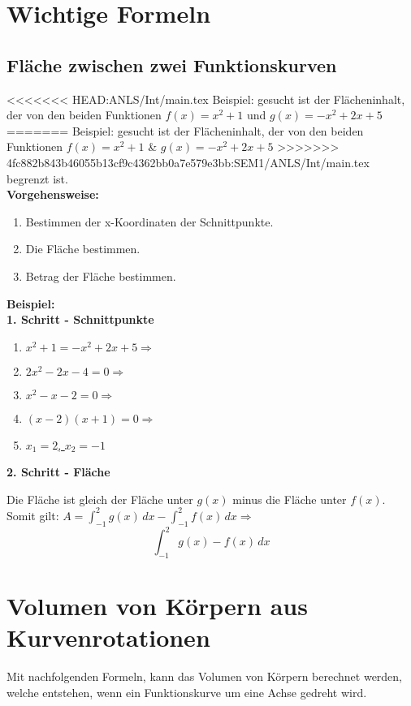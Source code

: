 \documentclass[12pt]{scrartcl}
\begin{document}
\newpage
\section{Wichtige Formeln}
\subsection{Fläche zwischen zwei Funktionskurven}
<<<<<<< HEAD:ANLS/Int/main.tex
Beispiel: gesucht ist der Flächeninhalt, der von den beiden Funktionen $f(x) = x^2 + 1$ und $g(x) = -x^2 + 2x + 5$
=======
Beispiel: gesucht ist der Flächeninhalt, der von den beiden Funktionen $f(x) = x^2 + 1$ \& $g(x) = -x^2 + 2x + 5$
>>>>>>> 4fc882b843b46055b13cf9c4362bb0a7e579e3bb:SEM1/ANLS/Int/main.tex
begrenzt ist.\\


\textbf{Vorgehensweise:}
\begin{enumerate}
    \item Bestimmen der x-Koordinaten der Schnittpunkte.
    \item Die Fläche bestimmen.
    \item Betrag der Fläche bestimmen.
\end{enumerate}

\hfill \break

\textbf{Beispiel:}\\
\textbf{1. Schritt - Schnittpunkte}
\begin{enumerate}
    \item $x^2 + 1 = -x^2 + 2x + 5 \Rightarrow$
    \item $2x^2 -2x -4 = 0 \Rightarrow $
    \item $x^2 - x - 2 = 0 \Rightarrow$
    \item $(x-2)(x+1) = 0 \Rightarrow$
    \item \underline{$x_1 = 2$, $x_2 = -1$}
\end{enumerate}

\hfill \break
\textbf{2. Schritt - Fläche}

Die Fläche ist gleich der Fläche unter $g(x)$ minus die Fläche unter $f(x)$.\\
Somit gilt:
$A = \int_{-1}^{2} g(x)\, dx - \int_{-1}^{2} f(x)\, dx \Rightarrow$
\[ \int_{-1}^{2} g(x) - f(x)\, dx \]

\section{Volumen von Körpern aus Kurvenrotationen}
Mit nachfolgenden Formeln, kann das Volumen von Körpern berechnet werden, welche entstehen, wenn ein
Funktionskurve um eine Achse gedreht wird.
 
\end{document}
